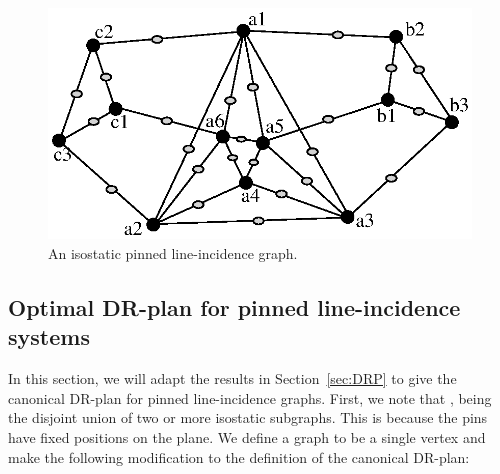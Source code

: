 \begin{figure}
  \centering
   \includegraphics[width=.7\linewidth]{img/pinned}
\caption{ An isostatic pinned line-incidence graph.}
\label{fig:pinned_line}
\end{figure}


\subsection{Optimal DR-plan for pinned line-incidence systems}


In this section, we will adapt the results in Section~\ref{sec:DRP}
to give the canonical DR-plan for pinned line-incidence graphs.
First, we note that %
,
being the disjoint union of two or more isostatic subgraphs.
This is because the pins have fixed positions on the plane.
%
%
%
%
%
%
%
We define a  graph to be a single vertex and make the following modification to the definition of 
the canonical DR-plan:

